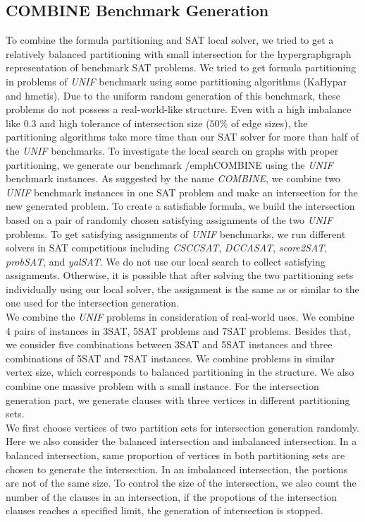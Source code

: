 \documentclass[12pt,a4paper,twoside]{scrartcl}
\numberwithin{equation}{section}
\begin{document}
\subsection{COMBINE Benchmark Generation}
To combine the formula partitioning and SAT local solver, we tried to get a relatively balanced partitioning with small intersection for the hypergraphgraph representation of benchmark SAT problems.  We tried to get formula partitioning in problems of \emph{UNIF} benchmark using some partitioning algorithms (KaHypar and hmetis). Due to the uniform random generation of this benchmark, these problems do not possess a real-world-like structure. Even with a high imbalance like $0.3$ and high tolerance of intersection size ($50\%$ of edge sizes), the partitioning algorithms take more time than our SAT solver for more than half of the  \emph{UNIF} benchmarks.  To investigate the local search on graphs with proper partitioning, we generate our benchmark /emph{COMBINE}  using the  \emph{UNIF} benchmark instances.  As suggested by the name \emph{COMBINE}, we combine two \emph{UNIF} benchmark instances in one SAT problem and make an intersection for the new generated problem.  To create a satisfiable formula, we build the intersection based on a pair of randomly chosen satisfying assignments of the two \emph{UNIF} problems. To get satisfying assignments of  \emph{UNIF} benchmarks, we run different solvers in SAT competitions including \emph{CSCCSAT}, \emph{DCCASAT}, \emph{score2SAT}, \emph{probSAT}, and \emph{yalSAT}. We do not use our local search to collect satisfying assignments. Otherwise, it is possible that after solving the two partitioning sets individually using our local solver, the assignment is the same as or similar to the one used for the intersection generation.\\
We combine the \emph{UNIF} problems in consideration of real-world uses. 
We combine 4 pairs of instances in  3SAT, 5SAT problems and 7SAT problems. Besides that, we consider five combinations between  3SAT and 5SAT instances and three combinations of 5SAT and 7SAT instances. 
We combine problems in similar vertex size, which corresponds to balanced partitioning in the structure. We also combine one massive problem with a small instance. For the intersection generation part, we generate clauses with three vertices in different partitioning sets. \\
We first choose vertices of two partition sets for intersection generation randomly. Here we also consider the balanced intersection and imbalanced intersection. In a balanced intersection, same proportion of vertices in both partitioning sets are chosen to generate the intersection. In an imbalanced intersection, the portions are not of the same size.  To control the size of the intersection, we also count the number of the clauses in an intersection, if the propotions of the intersection clauses reaches a specified limit, the generation of intersection is stopped.\\
\end{document}
